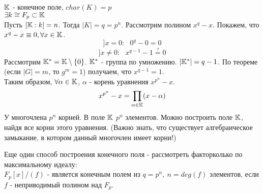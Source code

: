 $\mathbb{K}$ - конечное поле, $char(K) = p$\\
$\exists k \cong F_p \subset \mathbb{K}$\\
Пусть $[\mathbb{K}:k] = n$. Тогда $|K| = q = p^n$.
Рассмотрим полином $x^q-x$. Покажем, что $x^q - x \equiv 0, \forall x \in \mathbb{K}$.
\[]x = 0:~~~0^q - 0 = 0\]
\[]x \neq 0:~~~x^{q-1} - 1 \overset{?}{=} 0\]
Рассмотрим $\mathbb{K}^* = \mathbb{K} \setminus \{0\}$. $\mathbb{K}^*$ - группа по умножению. $|\mathbb{K}^*| = q - 1$. По теореме
(если $|G| = m$, то $g^m = 1$) получаем, что $x^{q - 1} = 1$. \\
Таким образом, $\forall \alpha \in \mathbb{K}$, $\alpha$ - корень уравнения $x^{p^n} - x$. \\
\[x^{p^n} - x = \underset{\alpha \in \mathbb{K}}{\prod}(x - \alpha)\]
У многочлена $p^n$ корней. В поле $\mathbb{K}$ $p^n$ элементов. Можно построить поле $\mathbb{K}$, найдя все корни этого
уравнения. (Важно знать, что существует алгебраическое замыкание, в котором данный многочлен имеет корни!)

Еще один способ построения конечного поля - рассмотреть факторколько по максимальному идеалу: \\
$F_p[x] / (f)$ - является конечным полем из $q = p^n,~n = deg(f)$ элементов, если $f$ - неприводимый полином над $F_p$.



